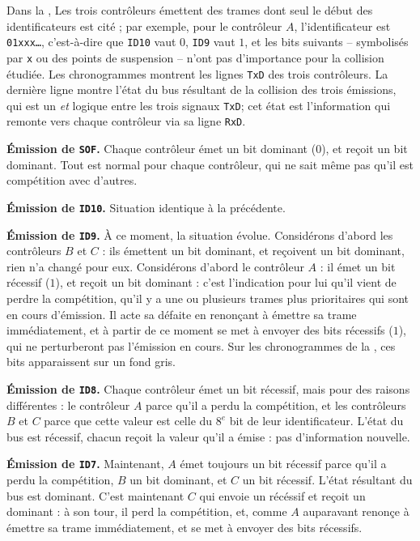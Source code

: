 Dans la , Les trois contrôleurs émettent des trames dont seul le début des identificateurs est cité ; par exemple, pour le contrôleur $A$, l'identificateur est \texttt{01xxx\dots}, c'est-à-dire que \texttt{ID10} vaut $0$, \texttt{ID9} vaut $1$, et les bits suivants -- symbolisés par \texttt{x} ou des points de suspension -- n'ont pas d'importance pour la collision étudiée. Les chronogrammes montrent les lignes \texttt{TxD} des trois contrôleurs. La dernière ligne montre l'état du bus résultant de la collision des trois émissions, qui est un \emph{et} logique entre les trois signaux \texttt{TxD}; cet état est l'information qui remonte vers chaque contrôleur via sa ligne \texttt{RxD}.

{\bf Émission de \texttt{SOF}.} Chaque contrôleur émet un bit dominant ($0$), et reçoit un bit dominant. Tout est normal pour chaque contrôleur, qui ne sait même pas qu'il est compétition avec d'autres.

{\bf Émission de \texttt{ID10}.} Situation identique à la précédente.

{\bf Émission de \texttt{ID9}.} À ce moment, la situation évolue. Considérons d'abord les contrôleurs $B$ et $C$ : ils émettent un bit dominant, et reçoivent un bit dominant, rien n'a changé pour eux. Considérons d'abord le contrôleur $A$ : il émet un bit récessif ($1$), et reçoit un bit dominant : c'est l'indication pour lui qu'il vient de perdre la compétition, qu'il y a une ou plusieurs trames plus prioritaires qui sont en cours d'émission. Il acte sa défaite en renonçant à émettre sa trame immédiatement, et à partir de ce moment se met à envoyer des bits récessifs ($1$), qui ne perturberont pas l'émission en cours. Sur les chronogrammes de la , ces bits apparaissent sur un fond gris.

{\bf Émission de \texttt{ID8}.} Chaque contrôleur émet un bit récessif, mais pour des raisons différentes : le contrôleur $A$ parce qu'il a perdu la compétition, et les contrôleurs $B$ et $C$ parce que cette valeur est celle du $8^e$ bit de leur identificateur. L'état du bus est récessif, chacun reçoit la valeur qu'il a émise : pas d'information nouvelle.


{\bf Émission de \texttt{ID7}.} Maintenant, $A$ émet toujours un bit récessif parce qu'il a perdu la compétition, $B$ un bit dominant, et $C$ un bit récessif. L'état résultant du bus est dominant. C'est maintenant $C$ qui envoie un récéssif et reçoit un dominant : à son tour, il perd la compétition, et, comme $A$ auparavant renonçe à émettre sa trame immédiatement, et se met à envoyer des bits récessifs.

